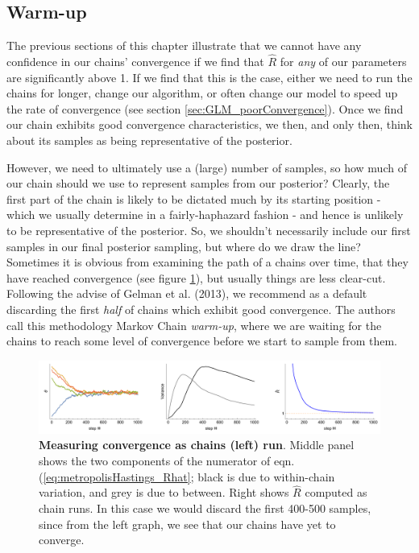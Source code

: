 \documentclass[11pt,fullpage]{book}
\begin{document}
\subsection{Warm-up}\label{sec:metropolisHastings_warmup}
The previous sections of this chapter illustrate that we cannot have any confidence in our chains' convergence if we find that $\hat{R}$ for \textit{any} of our parameters are significantly above 1. If we find that this is the case, either we need to run the chains for longer, change our algorithm, or often change our model to speed up the rate of convergence (see section \ref{sec:GLM_poorConvergence}). Once we find our chain exhibits good convergence characteristics, we then, and only then, think about its samples as being representative of the posterior.

However, we need to ultimately use a (large) number of samples, so how much of our chain should we use to represent samples from our posterior? Clearly, the first part of the chain is likely to be dictated much by its starting position - which we usually determine in a fairly-haphazard fashion - and hence is unlikely to be representative of the posterior. So, we shouldn't necessarily include our first samples in our final posterior sampling, but where do we draw the line? Sometimes it is obvious from examining the path of a chains over time, that they have reached convergence (see figure \ref{fig:metropolisHastings_warmUp}), but usually things are less clear-cut. Following the advise of Gelman et al. (2013), we recommend as a default discarding the first \textit{half} of chains which exhibit good convergence. The authors call this methodology Markov Chain \textit{warm-up}, where we are waiting for the chains to reach some level of convergence before we start to sample from them. 

\begin{figure}
\centerline{\includegraphics[width=1\textwidth]{metropolisHastings_warmUp.pdf}}
\caption{\textbf{Measuring convergence as chains (left) run}. Middle panel shows the two components of the numerator of eqn. (\ref{eq:metropolisHastings_Rhat}; black is due to within-chain variation, and grey is due to between. Right shows $\hat{R}$ computed as chain runs. In this case we would discard the first 400-500 samples, since from the left graph, we see that our chains have yet to converge. }\label{fig:metropolisHastings_warmUp}
\end{figure}
\end{document}
